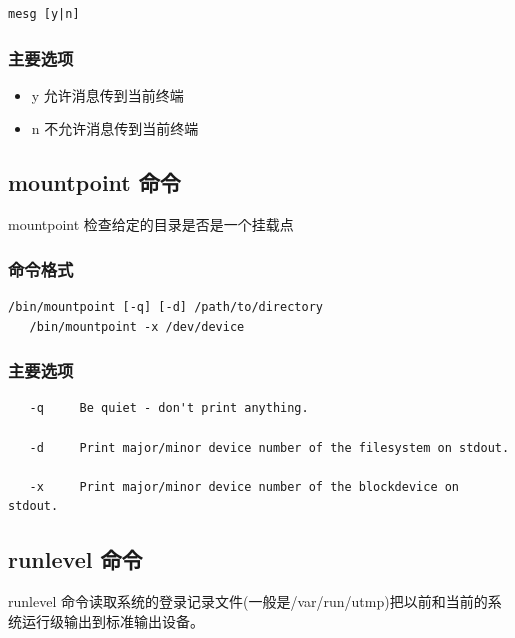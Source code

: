 {\begin{shaded}\begin{verbatim}
mesg [y|n]
\end{verbatim}\end{shaded}}
\subsubsection{主要选项}

\begin{itemize}
\item
  y 允许消息传到当前终端
\item
  n 不允许消息传到当前终端
\end{itemize}
\subsection{mountpoint 命令}

mountpoint 检查给定的目录是否是一个挂载点

\subsubsection{命令格式}

{\begin{shaded}\begin{verbatim}
/bin/mountpoint [-q] [-d] /path/to/directory
   /bin/mountpoint -x /dev/device
\end{verbatim}\end{shaded}}
\subsubsection{主要选项}

{\begin{shaded}\begin{verbatim}
   -q     Be quiet - don't print anything.

   -d     Print major/minor device number of the filesystem on stdout.

   -x     Print major/minor device number of the blockdevice on stdout.
\end{verbatim}\end{shaded}}
\subsection{runlevel 命令}

runlevel
命令读取系统的登录记录文件(一般是/var/run/utmp)把以前和当前的系统运行级输出到标准输出设备。

